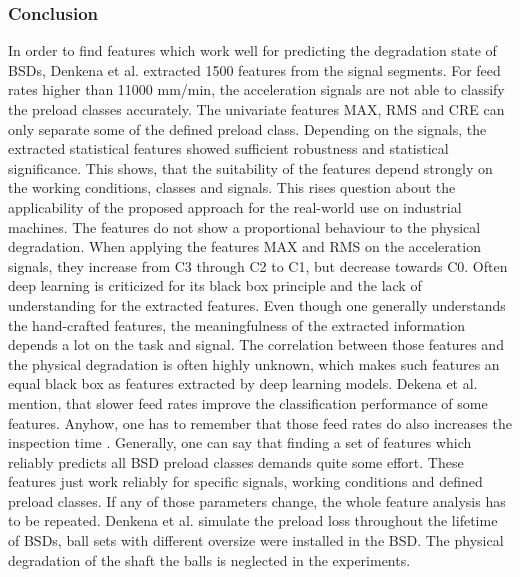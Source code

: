 \subsubsection{Conclusion}
In order to find features which work well for predicting the degradation state of BSDs, Denkena et al. extracted 1500 features from the signal segments. For feed rates higher than 11000 mm/min, the acceleration signals are not able to classify the preload classes accurately. The univariate features MAX, RMS and CRE can only separate some of the defined preload class. Depending on the signals, the extracted statistical features showed sufficient robustness and statistical significance. This shows, that the suitability of the features depend strongly on the working conditions, classes and signals. This rises question about the applicability of the proposed approach for the real-world use on industrial machines. The features do not show a proportional behaviour to the physical degradation. When applying the features MAX and RMS on the acceleration signals, they increase from C3 through C2 to C1, but decrease towards C0. Often deep learning is criticized for its black box principle and the lack of understanding for the extracted features. Even though one generally understands the hand-crafted features, the meaningfulness of the extracted information depends a lot on the task and signal. The correlation between those features and the physical degradation is often highly unknown, which makes such features an equal black box as features extracted by deep learning models. Dekena et al. mention, that slower feed rates improve the classification performance of some features. Anyhow, one has to remember that those feed rates do also increases the inspection time . Generally, one can say that finding a set of features which reliably predicts all BSD preload classes demands quite some effort. These features just work reliably for specific signals, working conditions and defined preload classes. If any of those parameters change, the whole feature analysis has to be repeated. Denkena et al. simulate the preload loss throughout the lifetime of BSDs, ball sets with different oversize were installed in the BSD. The physical degradation of the shaft the balls is neglected in the experiments.

